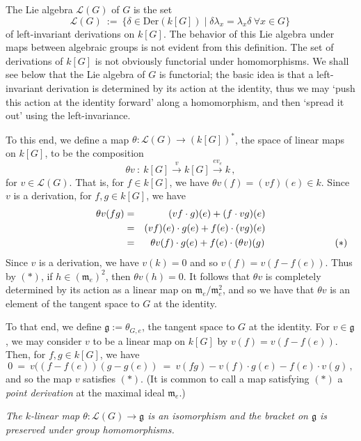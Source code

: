 \documentclass[12pt]{amsart}
\begin{document}
The Lie algebra ${\mathcal L}(G)$ of $G$  is the set 
$$
   {\mathcal L}(G)\ :=\ 
        \{\delta\in \mbox{Der}(k[G])\mid \delta \lambda_x=\lambda_x\delta
        \  \forall x\in G\}\,
$$
of left-invariant derivations on $k[G]$.
The behavior of this Lie algebra under maps between algebraic groups is not
evident from this definition.
The set of derivations of $k[G]$ is not obviously functorial under
homomorphisms.
We shall see below that the Lie algebra of $G$ is functorial; the basic idea
is that a left-invariant derivation is determined by its action at the
identity, thus we may `push this action at the identity forward' along a
homomorphism, and then `spread it out' using the left-invariance.

To this end, we define a map $\theta: {\mathcal L}(G)\to (k[G])^*$, the
space of linear maps on $k[G]$, to be the composition
$$
  \theta v\ \colon\ k[G]\stackrel{v}{\longrightarrow} k[G]
             \stackrel{ev_e}{\longrightarrow} k\,,
$$
for $v\in{\mathcal L}(G)$.
That is, for $f\in k[G]$, we have $\theta v (f)=(vf)(e)\in k$.
Since $v$ is a derivation, for $f,g\in k[G]$, we have
%
\begin{eqnarray*}
  \theta v(fg)&=& (vf\cdot g)(e) + (f\cdot vg)(e)\\
              &=& (vf)(e)\cdot g(e) + f(e)\cdot (vg)(e)\\
              &=& \theta v(f)\cdot g(e) + f(e)\cdot (\theta v)(g)
                  \makebox[.01in][l]{\hspace{1in}$(*)$}
\end{eqnarray*}
%
Since $v$ is a derivation, we have $v(k)=0$ and so 
$v(f)=v(f-f(e))$.
Thus by $(*)$, if $h\in ({\mathfrak m}_e)^2$, then $\theta v(h)=0$.
It follows that $\theta v$ is completely determined by its action as
a linear map on ${\mathfrak m}_e/{\mathfrak m}_e^2$,
and so we have that $\theta v$ is an element of the tangent space to $G$ 
at the identity.

To that end, we define ${\mathfrak g}:=\theta_{G,e}$, the tangent space to
$G$ at the identity.
For $v\in {\mathfrak g}$, we may consider $v$ to be a linear map on $k[G]$ by
$v(f)=v(f-f(e))$. 
Then, for $f,g\in k[G]$, we have
$$
  0\ =\ v((f-f(e))(g-g(e))\ =\ 
         v(fg)-v(f)\cdot g(e) - f(e)\cdot v(g)\,,
$$
and so the map $v$ satisfies $(*)$.
(It is common to call a map satisfying $(*)$ a {\sl point derivation} at the
maximal ideal ${\mathfrak m}_e$.)
\medskip


{\it 
The $k$-linear map $\theta\colon{\mathcal L}(G)\to {\mathfrak g}$
is an isomorphism and the bracket on ${\mathfrak g}$ is preserved under
group homomorphisms.}\medskip
\end{document}
